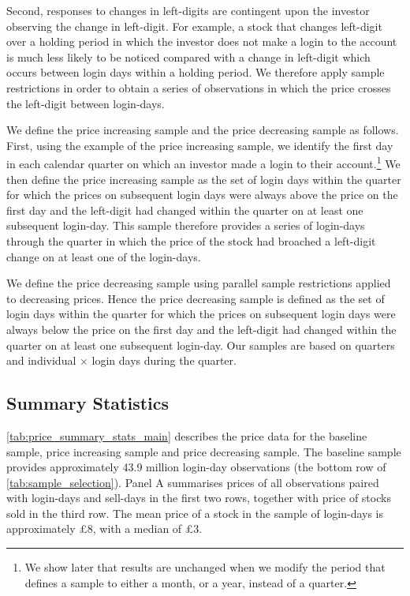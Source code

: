 Second, responses to changes in left-digits are contingent upon the investor observing the change in left-digit. For example, a stock that changes left-digit over a holding period in which the investor does not make a login to the account is much less likely to be noticed compared with a change in left-digit which occurs between login days within a holding period. We therefore apply sample restrictions in order to obtain a series of observations in which the price crosses the left-digit between login-days.

We define the price increasing sample and the price decreasing sample as follows. First, using the example of the price increasing sample, we identify the first day in each calendar quarter on which an investor made a login to their account.\footnote{We show later that results are unchanged when we modify the period that defines a sample to either a month, or a year, instead of a quarter.} We then define the price increasing sample as the set of login days within the quarter for which the prices on subsequent login days were always above the price on the first day and the left-digit had changed within the quarter on at least one subsequent login-day. This sample therefore provides a series of login-days through the quarter in which the price of the stock had broached a left-digit change on at least one of the login-days. 

We define the price decreasing sample using parallel sample restrictions applied to decreasing prices. Hence the price decreasing sample is defined as the set of login days within the quarter for which the prices on subsequent login days were always below the price on the first day and the left-digit had changed within the quarter on at least one subsequent login-day. Our samples are based on quarters and individual $\times$  login days during the quarter. 

\subsection{Summary Statistics}

\ref{tab:price_summary_stats_main} describes the price data for the baseline sample, price increasing sample and price decreasing sample. The baseline sample provides approximately 43.9 million login-day observations (the bottom row of \ref{tab:sample_selection}). Panel A summarises prices of all observations paired with login-days and sell-days in the first two rows, together with price of stocks sold in the third row. The mean price of a stock in the sample of login-days is approximately \pounds8, with a median of \pounds3. 

